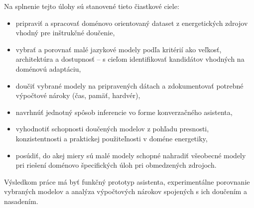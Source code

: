 Na splnenie tejto úlohy sú stanovené tieto čiastkové ciele:

\begin{itemize}
	\item pripraviť a spracovať doménovo orientovaný dataset z energetických zdrojov vhodný pre inštrukčné doučenie,
	\item vybrať a porovnať malé jazykové modely podľa kritérií ako veľkosť, architektúra a dostupnosť -- s cieľom identifikovať kandidátov vhodných na doménovú adaptáciu,
	\item doučiť vybrané modely na pripravených dátach a zdokumentovať potrebné výpočtové nároky (čas, pamäť, hardvér),
	\item navrhnúť jednotný spôsob inferencie vo forme konverzačného asistenta,
	\item vyhodnotiť schopnosti doučených modelov z pohľadu presnosti, konzistentnosti a praktickej použiteľnosti v doméne energetiky,
	\item posúdiť, do akej miery sú malé modely schopné nahradiť všeobecné modely pri riešení doménovo špecifických úloh pri obmedzených zdrojoch.
\end{itemize}

Výsledkom práce má byť funkčný prototyp asistenta, experimentálne porovnanie vybraných modelov a analýza výpočtových nárokov spojených s ich doučením a nasadením.
